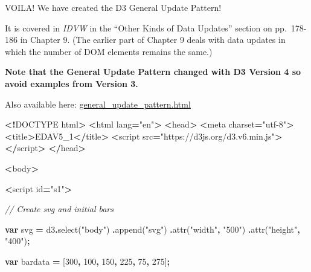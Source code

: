 \documentclass[
  openany]{book}
\newenvironment{Shaded}{\begin{snugshade}}{\end{snugshade}}
\newcommand{\CommentTok}[1]{\textcolor[rgb]{0.56,0.35,0.01}{\textit{#1}}}
\newcommand{\DecValTok}[1]{\textcolor[rgb]{0.00,0.00,0.81}{#1}}
\newcommand{\FunctionTok}[1]{\textcolor[rgb]{0.00,0.00,0.00}{#1}}
\newcommand{\KeywordTok}[1]{\textcolor[rgb]{0.13,0.29,0.53}{\textbf{#1}}}
\newcommand{\NormalTok}[1]{#1}
\newcommand{\OperatorTok}[1]{\textcolor[rgb]{0.81,0.36,0.00}{\textbf{#1}}}
\newcommand{\StringTok}[1]{\textcolor[rgb]{0.31,0.60,0.02}{#1}}
\begin{document}
VOILA! We have created the D3 General Update Pattern!

It is covered in \emph{IDVW} in the ``Other Kinds of Data Updates'' section on pp.~178-186 in Chapter 9. (The earlier part of Chapter 9 deals with data updates in which the number of DOM elements remains the same.)

\textbf{Note that the General Update Pattern changed with D3 Version 4 so avoid examples from Version 3.}

Also available here: \href{code/general_update_pattern.html}{general\_update\_pattern.html}

\begin{Shaded}
\begin{Highlighting}[]
\OperatorTok{\textless{}!}\NormalTok{DOCTYPE html}\OperatorTok{\textgreater{}}
\OperatorTok{\textless{}}\NormalTok{html lang}\OperatorTok{=}\StringTok{"en"}\OperatorTok{\textgreater{}}
  \OperatorTok{\textless{}}\NormalTok{head}\OperatorTok{\textgreater{}}
    \OperatorTok{\textless{}}\NormalTok{meta charset}\OperatorTok{=}\StringTok{"utf{-}8"}\OperatorTok{\textgreater{}}
    \OperatorTok{\textless{}}\NormalTok{title}\OperatorTok{\textgreater{}}\NormalTok{EDAV5\_1}\OperatorTok{\textless{}/}\NormalTok{title}\OperatorTok{\textgreater{}}
    \OperatorTok{\textless{}}\NormalTok{script src}\OperatorTok{=}\StringTok{"https://d3js.org/d3.v6.min.js"}\OperatorTok{\textgreater{}\textless{}/}\NormalTok{script}\OperatorTok{\textgreater{}}
  \OperatorTok{\textless{}/}\NormalTok{head}\OperatorTok{\textgreater{}}

  \OperatorTok{\textless{}}\NormalTok{body}\OperatorTok{\textgreater{}}

    \OperatorTok{\textless{}}\NormalTok{script id}\OperatorTok{=}\StringTok{"s1"}\OperatorTok{\textgreater{}}

\CommentTok{// Create svg and initial bars}

\KeywordTok{var}\NormalTok{ svg }\OperatorTok{=}\NormalTok{ d3}\OperatorTok{.}\FunctionTok{select}\NormalTok{(}\StringTok{"body"}\NormalTok{)}
  \OperatorTok{.}\FunctionTok{append}\NormalTok{(}\StringTok{"svg"}\NormalTok{)}
    \OperatorTok{.}\FunctionTok{attr}\NormalTok{(}\StringTok{"width"}\OperatorTok{,} \StringTok{"500"}\NormalTok{)}
    \OperatorTok{.}\FunctionTok{attr}\NormalTok{(}\StringTok{"height"}\OperatorTok{,} \StringTok{"400"}\NormalTok{)}\OperatorTok{;}

\KeywordTok{var}\NormalTok{ bardata }\OperatorTok{=}\NormalTok{ [}\DecValTok{300}\OperatorTok{,} \DecValTok{100}\OperatorTok{,} \DecValTok{150}\OperatorTok{,} \DecValTok{225}\OperatorTok{,} \DecValTok{75}\OperatorTok{,} \DecValTok{275}\NormalTok{]}\OperatorTok{;}


\end{Highlighting}
\end{Shaded}
\end{document}
